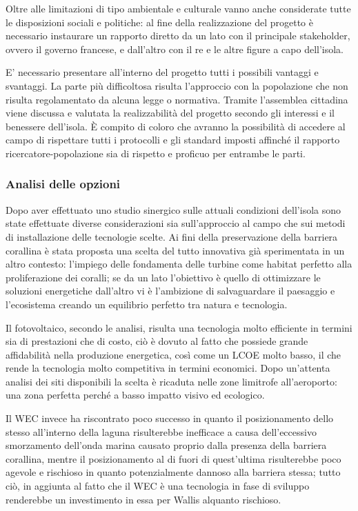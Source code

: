 \documentclass[fleqn,11pt]{SelfArx} %
\begin{document}
Oltre alle limitazioni di tipo ambientale e culturale vanno anche considerate tutte le disposizioni sociali e politiche: al fine della realizzazione del progetto è necessario instaurare un rapporto diretto da un lato con il principale stakeholder, ovvero il governo francese, e dall'altro con il re e le altre figure a capo dell'isola. 

E' necessario presentare all'interno del progetto tutti i possibili vantaggi e svantaggi. La parte più difficoltosa risulta l'approccio con la popolazione che non risulta regolamentato da alcuna legge o normativa. Tramite l'assemblea cittadina viene discussa e valutata la realizzabilità del progetto secondo gli interessi e il benessere dell'isola. È compito di coloro che avranno la possibilità di accedere al campo di rispettare tutti i protocolli e gli standard imposti affinché il rapporto ricercatore-popolazione sia di rispetto e proficuo per entrambe le parti.


\subsubsection{Analisi delle opzioni}

Dopo aver effettuato uno studio sinergico sulle attuali condizioni dell'isola sono state effettuate diverse considerazioni sia sull'approccio al campo che sui metodi di installazione delle tecnologie scelte. Ai fini della preservazione della barriera corallina è stata proposta una scelta del tutto innovativa già sperimentata in un altro contesto: l'impiego delle fondamenta delle turbine come habitat perfetto alla proliferazione dei coralli; se da un lato l'obiettivo è quello di ottimizzare le soluzioni energetiche dall'altro vi è l'ambizione di salvaguardare il paesaggio e l'ecosistema creando un equilibrio perfetto tra natura e tecnologia. 

Il fotovoltaico, secondo le analisi, risulta una tecnologia molto efficiente in termini sia di prestazioni che di costo, ciò è dovuto al fatto che possiede grande affidabilità nella produzione energetica, così come un LCOE molto basso, il che rende la tecnologia molto competitiva in termini economici. 
Dopo un'attenta analisi dei siti disponibili la scelta è ricaduta nelle zone limitrofe all'aeroporto: una zona perfetta perché a basso impatto visivo ed ecologico. 

Il WEC invece ha riscontrato poco successo in quanto il posizionamento dello stesso all'interno della laguna risulterebbe inefficace a causa dell'eccessivo smorzamento dell'onda marina causato proprio dalla presenza della barriera corallina, mentre il posizionamento al di fuori di quest'ultima risulterebbe poco agevole e rischioso in quanto potenzialmente dannoso alla barriera stessa; tutto ciò, in aggiunta al fatto che il WEC è una tecnologia in fase di sviluppo renderebbe un investimento in essa per Wallis alquanto rischioso.
\end{document}
